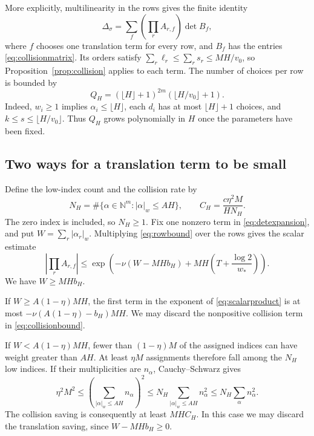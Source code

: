 \documentclass[11pt]{article}
\theoremstyle{definition}
\theoremstyle{remark}
\theoremstyle{plain}
\newcommand{\N}{\mathbb N}
\newcommand{\wt}[1]{\lvert #1\rvert_w}
\begin{document}
More explicitly, multilinearity in the rows gives the finite identity
\begin{equation}\label{eq:detexpansion}
 \Delta_\sigma=\sum_f\left(\prod_r A_{r,f}\right)\det B_f,
\end{equation}
where \(f\) chooses one translation term for every row, and \(B_f\)
has the entries \eqref{eq:collisionmatrix}. Its orders satisfy
\(\sum_r\ell_r\le\sum_rs_r\le MH/v_0\), so
Proposition~\ref{prop:collision} applies to each term. The number of
choices per row is bounded by
\begin{equation}\label{eq:choicecount}
 Q_H=(\lfloor H\rfloor+1)^{2m}
                    (\lfloor H/v_0\rfloor+1).
\end{equation}
Indeed, \(w_i\ge1\) implies \(\alpha_i\le\lfloor H\rfloor\),
each \(d_i\) has at most \(\lfloor H\rfloor+1\) choices, and
\(k\le s\le\lfloor H/v_0\rfloor\). Thus \(Q_H\) grows
polynomially in \(H\) once the parameters have been fixed.

\subsection{Two ways for a translation term to be small}
Define the low-index count and the collision rate by
\begin{equation}\label{eq:capacity}
 N_H=\#\{\alpha\in\N^m:\wt\alpha\le AH\},\qquad
 C_H=\frac{c\eta^2M}{HN_H}.
\end{equation}
The zero index is included, so \(N_H\ge1\). Fix one nonzero term in
\eqref{eq:detexpansion}, and put \(W=\sum_r\wt{\alpha_r}\).
Multiplying \eqref{eq:rowbound} over the rows gives the scalar estimate
\begin{equation}\label{eq:scalarproduct}
 \left|\prod_r A_{r,f}\right|
 \le\exp\left(-\nu(W-MHb_H)+
                  MH\left(T+\frac{\log2}{w_*}\right)\right).
\end{equation}
We have \(W\ge MHb_H\).

If \(W\ge A(1-\eta)MH\), the first term in the exponent of
\eqref{eq:scalarproduct} is at most
\(-\nu(A(1-\eta)-b_H)MH\). We may discard the nonpositive
collision term in \eqref{eq:collisionbound}.

If \(W<A(1-\eta)MH\), fewer than \((1-\eta)M\) of the assigned
indices can have weight greater than \(AH\). At least \(\eta M\)
assignments therefore fall among the \(N_H\) low indices. If their
multiplicities are \(n_\alpha\), Cauchy--Schwarz gives
\[
 \eta^2M^2\le\left(\sum_{\wt\alpha\le AH}n_\alpha\right)^2
 \le N_H\sum_{\wt\alpha\le AH}n_\alpha^2
 \le N_H\sum_\alpha n_\alpha^2.
\]
The collision saving is consequently at least \(MHC_H\). In this
case we may discard the translation saving, since \(W-MHb_H\ge0\).
\end{document}
